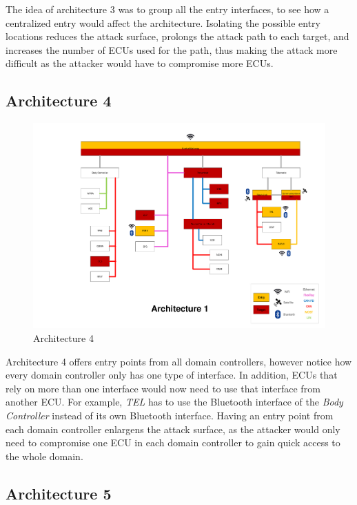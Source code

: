 The idea of architecture 3 was to group all the entry interfaces, to see how a centralized entry would affect the architecture.
Isolating the possible entry locations reduces the attack surface, prolongs the attack path to each target, and increases the number of ECUs used for the path, thus making the attack more difficult as the attacker would have to compromise more ECUs.\par


\subsection*{Architecture 4}
\label{sec:arch4}

\begin{figure}[h!]
    \caption{Architecture 4}
    \includegraphics[width=\textwidth, page=4]{../Architectures-survey.pdf}
\end{figure}

Architecture 4 offers entry points from all domain controllers, however notice how every domain controller only has one type of interface.
In addition, ECUs that rely on more than one interface would now need to use that interface from another ECU.
For example, \textit{TEL} has to use the Bluetooth interface of the \textit{Body Controller} instead of its own Bluetooth interface.
Having an entry point from each domain controller enlargens the attack surface, as the attacker would only need to compromise one ECU in each domain controller to gain quick access to the whole domain.\par


\subsection*{Architecture 5}
\label{sec:arch5}

